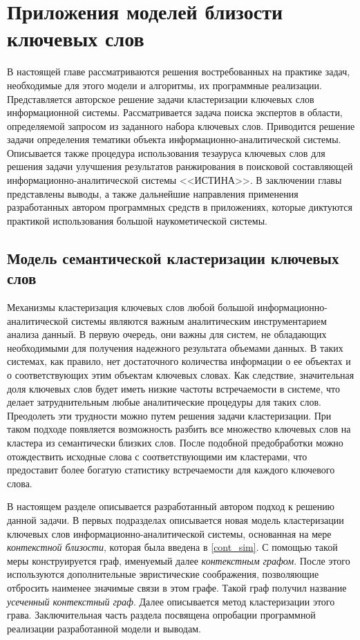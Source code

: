 \chapter{Приложения моделей близости ключевых слов} \label{chapt_applications}
В настоящей главе рассматриваются решения востребованных на практике задач, необходимые для этого модели и алгоритмы, их программные реализации.
Представляется авторское решение задачи кластеризации ключевых слов информационной системы. Рассматривается задача поиска экспертов в области, определяемой запросом из заданного набора ключевых слов.  Приводится решение задачи определения тематики объекта информационно-аналитической системы. Описывается также процедура использования тезауруса ключевых слов для решения задачи улучшения результатов ранжирования в поисковой составляющей информационно-аналитической системы <<ИСТИНА>>.  В заключении главы представлены выводы, а также дальнейшие направления применения разработанных автором программных средств в приложениях, которые диктуются практикой использования большой наукометической системы.

\section{Модель семантической кластеризации ключевых слов} \label{clustering}
Механизмы кластеризация ключевых слов любой большой информационно-аналитической системы являются важным аналитическим инструментарием анализа данный. В первую очередь, они важны для систем, не обладающих необходимыми для получения надежного результата объемами данных. В таких системах, как правило, нет достаточного количества информации о ее объектах и о соответствующих этим объектам ключевых словах. Как следствие,  значительная доля ключевых слов будет иметь низкие частоты встречаемости в системе, что делает затруднительным любые аналитические процедуры для таких слов. Преодолеть эти трудности можно путем решения задачи кластеризации. При таком подходе появляется возможность разбить все множество ключевых слов на кластера из семантически близких слов. После подобной предобработки можно отождествить исходные слова с соответствующими им кластерами, что предоставит более богатую статистику встречаемости для каждого ключевого слова.

В настоящем разделе описывается разработанный автором подход к решению данной задачи. В первых подразделах описывается новая модель кластеризации ключевых слов информационно-аналитической системы, основанная на мере \emph{контекстной близости}, которая была введена в \ref{cont_sim}. С помощью такой меры конструируется граф, именуемый далее \emph{контекстным графом}. После этого используются  дополнительные эвристические соображения, позволяющие отбросить наименее значимые связи в этом графе. Такой граф получил название \emph{усеченный контекстный граф}. Далее описывается метод кластеризации этого грава.  Заключительная часть раздела посвящена опробации программной реализации разработанной модели и выводам.

